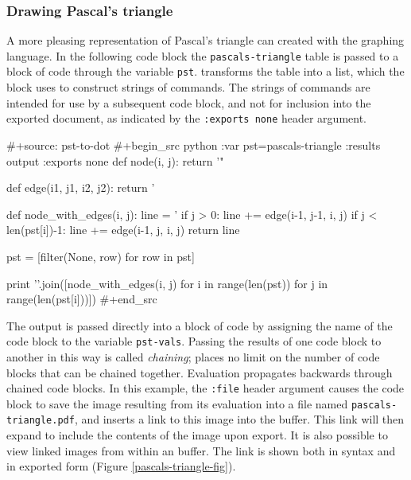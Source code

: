 \documentclass[article,shortnames]{jss}
\begin{document}
\subsubsection{Drawing Pascal's triangle}
\label{sec-4-1-2}

A more pleasing representation of Pascal's triangle can created with the 
graphing language.  In the following code block the \texttt{pascals-triangle}
table is passed to a block of  code through the
variable \texttt{pst}.   transforms the table into a  list,
which the  block uses to construct strings of  commands.  The
strings of  commands are intended for use by a subsequent code
block, and not for inclusion into the exported document, as indicated
by the \texttt{:exports none} header argument.


\begin{Code}
#+source: pst-to-dot
#+begin_src python :var pst=pascals-triangle :results output :exports none
  def node(i, j):
        return '"%

  def edge(i1, j1, i2, j2):
        return '%

  def node_with_edges(i, j):
        line = '%
        if j > 0:
              line += edge(i-1, j-1, i, j)
        if j < len(pst[i])-1:
              line += edge(i-1, j, i, j)
        return line

  pst = [filter(None, row) for row in pst]

  print '\n'.join([node_with_edges(i, j)
                   for i in range(len(pst))
                   for j in range(len(pst[i]))])
#+end_src
\end{Code}






The output is passed directly into a block of  code by assigning
the name of the  code block to the variable \texttt{pst-vals}.  Passing
the results of one code block to another in this way is called
\emph{chaining};  places no limit on the number of code blocks that
can be chained together.  Evaluation propagates backwards through
chained code blocks.  In this example, the \texttt{:file} header argument
causes the code block to save the image resulting from its evaluation
into a file named \texttt{pascals-triangle.pdf}, and inserts a link to this
image into the  buffer.  This link will then expand to include
the contents of the image upon export.  It is also possible to view
linked images from within an  buffer.  The link is shown both
in  syntax and in exported form (Figure
\ref{pascals-triangle-fig}).
\end{document}
